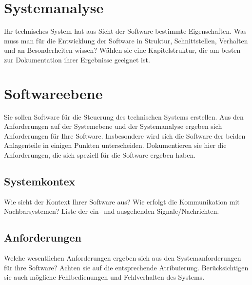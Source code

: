 \section{Systemanalyse}
Ihr technisches System hat aus Sicht der Software bestimmte
Eigenschaften. Was muss man für die Entwicklung der Software in
Struktur, Schnittstellen, Verhalten und an Besonderheiten wissen? Wählen
sie eine Kapitelstruktur, die am besten zur Dokumentation ihrer
Ergebnisse geeignet ist.

\section{Softwareebene}

Sie sollen Software für die Steuerung des technischen Systems erstellen.
Aus den Anforderungen auf der Systemebene und der Systemanalyse ergeben
sich Anforderungen für Ihre Software. Insbesondere wird sich die
Software der beiden Anlagenteile in einigen Punkten unterscheiden.
Dokumentieren sie hier die Anforderungen, die sich speziell für die
Software ergeben haben.

\subsection{Systemkontex}

Wie sieht der Kontext Ihrer Software aus? Wie erfolgt die Kommunikation
mit Nachbarsystemen? Liste der ein- und ausgehenden Signale/Nachrichten.

\subsection{Anforderungen}

Welche wesentlichen Anforderungen ergeben sich aus den
Systemanforderungen für ihre Software? Achten sie auf die entsprechende
Atribuierung. Berücksichtigen sie auch mögliche Fehlbedienungen und
Fehlverhalten des Systems.
